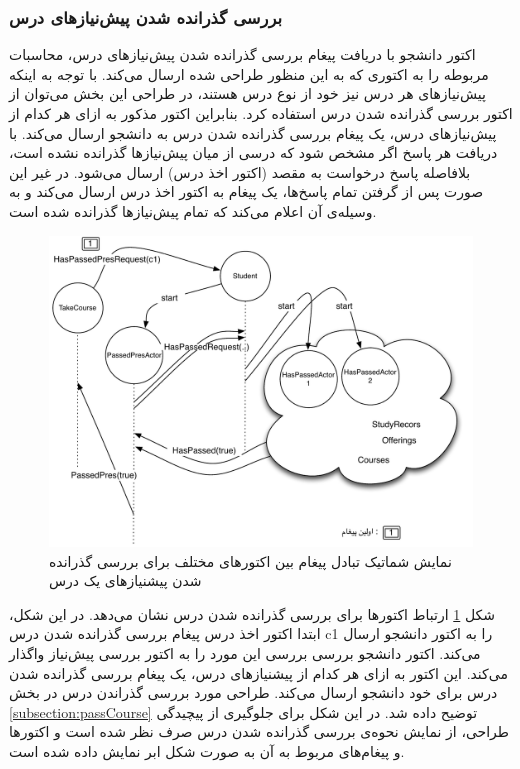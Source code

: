 \subsubsection{بررسی گذرانده شدن پیش‌نیازهای درس}
اکتور دانشجو با دریافت پیغام بررسی گذرانده شدن پیش‌نیازهای درس، محاسبات مربوطه را به اکتوری که به این منظور طراحی شده ارسال می‌کند. با توجه به اینکه پیش‌نیازهای هر درس نیز خود از نوع درس هستند، در طراحی این بخش می‌توان از اکتور بررسی گذرانده شدن درس استفاده کرد. بنابراین اکتور مذکور به ازای هر کدام از پیش‌نیازهای درس، یک پیغام بررسی گذرانده شدن درس به دانشجو ارسال می‌کند. با دریافت هر پاسخ اگر مشخص شود که درسی از میان پیش‌نیازها گذرانده نشده است، بلافاصله پاسخ درخواست به مقصد (اکتور اخذ درس) ارسال می‌شود. در غیر این صورت پس از گرفتن تمام پاسخ‌ها، یک پیغام به اکتور اخذ درس ارسال می‌کند و به وسیله‌ی آن اعلام می‌کند که تمام پیش‌نیازها گذرانده شده است.
\begin{figure}
    \begin{center}
	\includegraphics[width=14cm]{4-ProposedFramework/Figures/Prerequisites.pdf}
    \end{center}
    \caption{\label{fig:take_course_pres}نمایش شماتیک تبادل پیغام بین اکتورهای مختلف برای بررسی گذرانده شدن پیشنیازها‌ی یک درس }
\end{figure}
شکل \ref{fig:take_course_pres} ارتباط اکتورها برای بررسی گذرانده شدن درس نشان می‌دهد. در این شکل، ابتدا اکتور اخذ درس پیغام بررسی گذرانده شدن درس c1 را به اکتور دانشجو ارسال می‌کند. اکتور دانشجو بررسی بررسی این مورد را به اکتور بررسی پیش‌نیاز واگذار می‌کند. این اکتور به ازای هر کدام از پیشنیاز‌های  درس، یک پیغام بررسی گذرانده شدن درس برای خود دانشجو ارسال می‌کند. طراحی مورد بررسی گذراندن درس در بخش \ref{subsection:passCourse} توضیح داده شد. در این شکل برای جلوگیری از پیچیدگی طراحی، از نمایش نحوه‌ی بررسی گذرانده شدن درس صرف نظر شده است و اکتورها و پیغام‌های مربوط به آن به صورت شکل ابر نمایش داده شده است.

